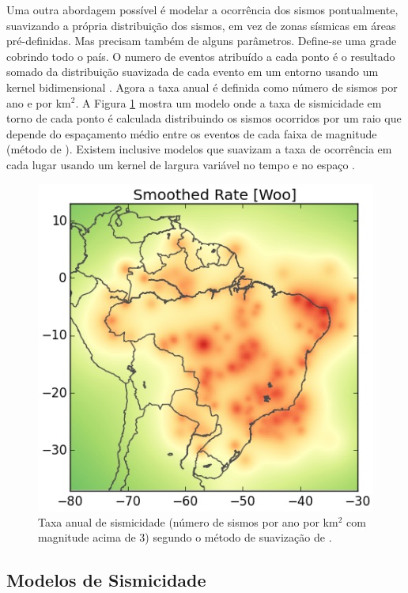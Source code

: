 \documentclass[jgrga]{agutex}
\begin{document}
\begin{article}
Uma outra abordagem possível é modelar a ocorrência dos sismos pontualmente, suavizando a própria distribuição dos sismos, em vez de zonas sísmicas em áreas pré-definidas. Mas precisam também de alguns parâmetros. Define-se uma grade cobrindo todo o país. O numero de eventos atribuído a cada ponto é o resultado somado da distribuição suavizada de cada evento em um entorno usando um kernel bidimensional \citep{frankel_1995}. Agora a taxa anual é definida como número de sismos por ano e por km$^2$. A Figura \ref{fig_woo} mostra um modelo onde a taxa de sismicidade em torno de cada ponto é calculada distribuindo os sismos ocorridos por um raio que depende do espaçamento médio entre os eventos de cada faixa de magnitude (método de \citet{woo_1996}). Existem inclusive modelos que suavizam a taxa de ocorrência em cada lugar usando um kernel de largura variável no tempo e no espaço \citep{helmstetter_2012}.

\begin{figure}[h]
	\centerline{\includegraphics[width=\hsize]{img_rate_W}}
	\caption{Taxa anual de sismicidade (número de sismos por ano por km$^2$ com magnitude acima de 3) segundo o método de suavização de \citet{woo_1996}.}
	\label{fig_woo}
\end{figure}

\subsection{Modelos de Sismicidade}


\end{article}
\end{document}
